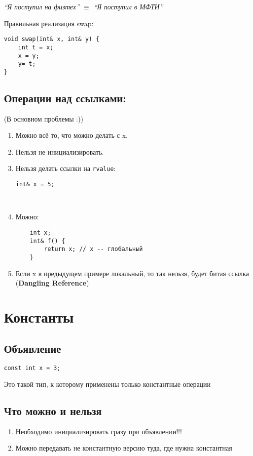\documentclass[12pt]{article}
\begin{document}
\textit{``Я поступил на физтех'' $\equiv$ ``Я поступил в МФТИ''}

Правильная реализация swap:

\begin{lstlisting}
void swap(int& x, int& y) {
	int t = x;
	x = y;
	y= t;
}
\end{lstlisting}

\subsection{Операции над ссылками:} (В основном проблемы :))

\begin{enumerate}
	\item Можно всё то, что можно делать с x. 
	\item Нельзя не инициализировать. 
	\item Нельзя делать ссылки на \texttt{rvalue}:
\begin{lstlisting}
int& x = 5;
\end{lstlisting} 
\

	\item Можно:
\begin{lstlisting}
	int x;
	int& f() {
		return x; // x -- глобальный
	}
\end{lstlisting}
	\item Если x в предыдущем примере локальный, то так нельзя, будет битая ссылка (\textbf{Dangling Reference})
\end{enumerate}

\section{Константы}

\subsection{Объявление}

\texttt{const int x = 3;}

Это такой тип, к которому применены только константные операции

\subsection{Что можно и нельзя}

\begin{enumerate}
	\item Необходимо инициализировать сразу при объявлении!!!
	\item Можно передавать не константную версию туда, где нужна константная
\end{enumerate}
\end{document}
